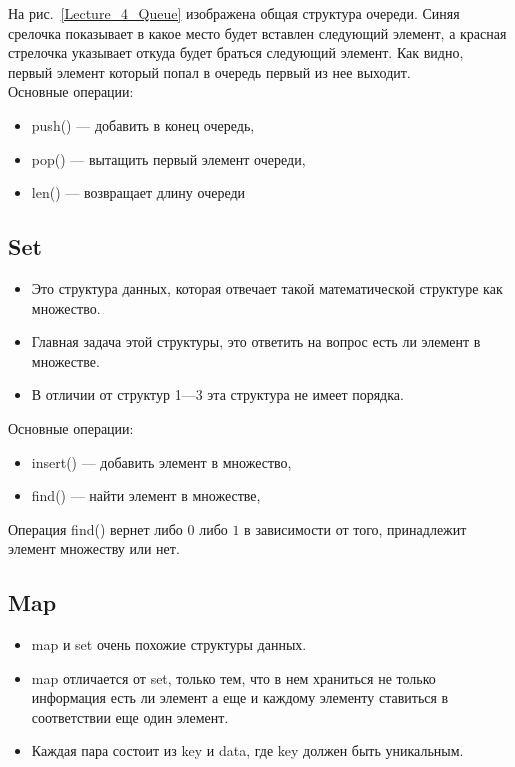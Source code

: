 На рис.~\ref{Lecture_4_Queue} изображена общая структура очереди. Синяя срелочка показывает в какое место будет вставлен следующий элемент, а красная стрелочка указывает откуда будет браться следующий элемент. Как видно, первый элемент который попал в очередь первый из нее выходит.\\

Основные операции:
\begin{itemize}
	\item push() --- добавить в конец очередь,
	\item pop()  --- вытащить первый элемент очереди,
	\item len() --- возвращает длину очереди
\end{itemize}


\subsection{Set}
\begin{itemize}
	\item Это структура данных, которая отвечает такой математической структуре как множество.
	\item Главная задача этой структуры, это ответить на вопрос есть ли элемент в множестве.
	\item В отличии от структур 1---3 эта структура не имеет порядка.
\end{itemize}

Основные операции:
\begin{itemize}
	\item insert() --- добавить элемент в множество,
	\item find()  --- найти элемент в множестве,
\end{itemize}

Операция find() вернет либо $0$ либо $1$ в зависимости от того, принадлежит элемент множеству или нет.

\subsection{Map}
\begin{itemize}
	\item map и set очень похожие структуры данных.
	\item map отличается от set, только тем, что в нем храниться не только информация есть ли элемент а еще и каждому элементу ставиться в соответствии еще один элемент.
	\item Каждая пара состоит из key и data, где key должен быть уникальным.
\end{itemize}

